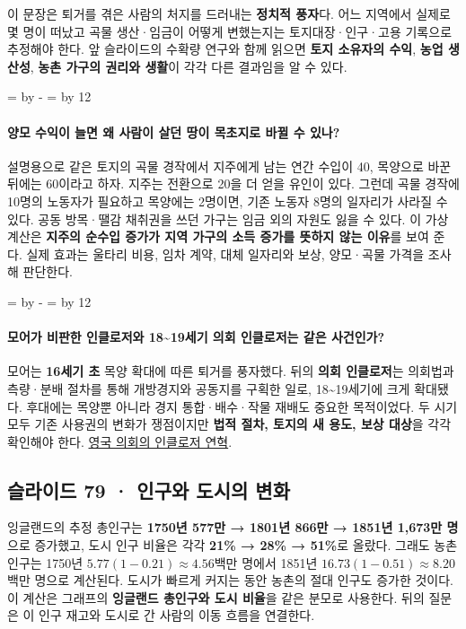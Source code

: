 \documentclass[10pt,a4paper]{article}
\newcommand{\ReserveQuestionSpace}{%
  \par\begingroup
  \dimen0=\pagegoal \advance\dimen0 by -\pagetotal
  \dimen2=\baselineskip \multiply\dimen2 by 12
  \ifdim\dimen0<\dimen2 \newpage\fi
  \endgroup}
\begin{document}
이 문장은 퇴거를 겪은 사람의 처지를 드러내는 \textbf{정치적 풍자}다. 어느 지역에서 실제로 몇 명이 떠났고 곡물 생산·임금이 어떻게 변했는지는 토지대장·인구·고용 기록으로 추정해야 한다. 앞 슬라이드의 수확량 연구와 함께 읽으면 \textbf{토지 소유자의 수익}, \textbf{농업 생산성}, \textbf{농촌 가구의 권리와 생활}이 각각 다른 결과임을 알 수 있다.\par

\ReserveQuestionSpace
\paragraph{양모 수익이 늘면 왜 사람이 살던 땅이 목초지로 바뀔 수 있나?}
설명용으로 같은 토지의 곡물 경작에서 지주에게 남는 연간 수입이 40, 목양으로 바꾼 뒤에는 60이라고 하자. 지주는 전환으로 20을 더 얻을 유인이 있다. 그런데 곡물 경작에 10명의 노동자가 필요하고 목양에는 2명이면, 기존 노동자 8명의 일자리가 사라질 수 있다. 공동 방목·땔감 채취권을 쓰던 가구는 임금 외의 자원도 잃을 수 있다. 이 가상 계산은 \textbf{지주의 순수입 증가가 지역 가구의 소득 증가를 뜻하지 않는 이유}를 보여 준다. 실제 효과는 울타리 비용, 임차 계약, 대체 일자리와 보상, 양모·곡물 가격을 조사해 판단한다.\par

\ReserveQuestionSpace
\paragraph{모어가 비판한 인클로저와 18\textasciitilde{}19세기 의회 인클로저는 같은 사건인가?}
모어는 \textbf{16세기 초} 목양 확대에 따른 퇴거를 풍자했다. 뒤의 \textbf{의회 인클로저}는 의회법과 측량·분배 절차를 통해 개방경지와 공동지를 구획한 일로, 18\textasciitilde{}19세기에 크게 확대됐다. 후대에는 목양뿐 아니라 경지 통합·배수·작물 재배도 중요한 목적이었다. 두 시기 모두 기존 사용권의 변화가 쟁점이지만 \textbf{법적 절차, 토지의 새 용도, 보상 대상}을 각각 확인해야 한다. \href{https://www.parliament.uk/about/living-heritage/transformingsociety/towncountry/landscape/overview/enclosingland/}{영국 의회의 인클로저 연혁}.\par

\subsection{슬라이드 79 · 인구와 도시의 변화}
잉글랜드의 추정 총인구는 \textbf{1750년 577만 → 1801년 866만 → 1851년 1,673만 명}으로 증가했고, 도시 인구 비율은 각각 \textbf{21\% → 28\% → 51\%}로 올랐다. 그래도 농촌 인구는 1750년 $5.77(1-0.21)\approx4.56$백만 명에서 1851년 $16.73(1-0.51)\approx8.20$백만 명으로 계산된다. 도시가 빠르게 커지는 동안 농촌의 절대 인구도 증가한 것이다. 이 계산은 그래프의 \textbf{잉글랜드 총인구와 도시 비율}을 같은 분모로 사용한다. 뒤의 질문은 이 인구 재고와 도시로 간 사람의 이동 흐름을 연결한다.\par
\end{document}
